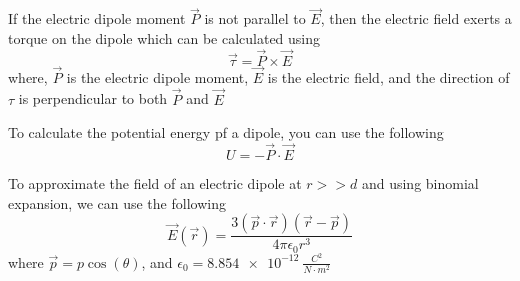 If the electric dipole moment $\vec{P}$ is not parallel to $\vec{E}$, then the electric field exerts a torque on the dipole which can be calculated using
\begin{equation}
\vec{\tau} = \vec{P} \times \vec{E}
\end{equation}
where, $\vec{P}$ is the electric dipole moment, $\vec{E}$ is the electric field, and the direction of $\tau$ is perpendicular to both $\vec{P}$ and $\vec{E}$

To calculate the potential energy pf a dipole, you can use the following
\begin{equation}
U = -\vec{P}\cdot \vec{E}
\end{equation}

To approximate the field of an electric dipole at $r>>d$ and using binomial expansion, we can use the following
\begin{equation}
\vec{E}(\vec{r}) = \frac{3(\vec{p}\cdot \vec{r})(\vec{r} - \vec{p})}{4 \pi \epsilon_0 r^3}
\end{equation}
where $\vec{p} = p\cos(\theta)$, and $\epsilon_0 = \SI{8.854e-12}{\frac{C^2}{N \cdot m^2}}$

